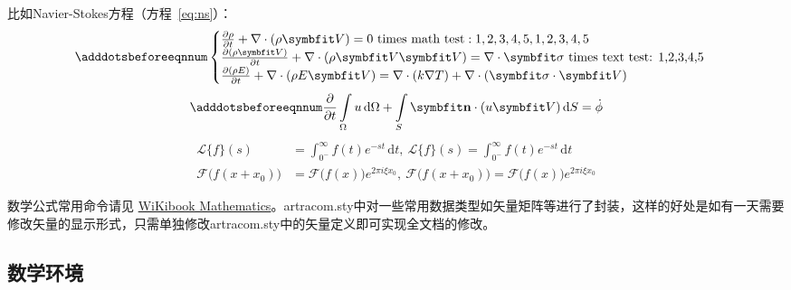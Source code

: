 比如Navier-Stokes方程（方程~\eqref{eq:ns}）：
\begin{equation} \label{eq:ns}
    \adddotsbeforeeqnnum%
    \begin{cases}
        \frac{\partial \rho}{\partial t} + \nabla\cdot(\rho\Vector{V}) = 0 \ \mathrm{times\ math\ test: 1,2,3,4,5}, 1,2,3,4,5\\
        \frac{\partial (\rho\Vector{V})}{\partial t} + \nabla\cdot(\rho\Vector{V}\Vector{V}) = \nabla\cdot\Tensor{\sigma} \ \text{times text test: 1,2,3,4,5}\\
        \frac{\partial (\rho E)}{\partial t} + \nabla\cdot(\rho E\Vector{V}) = \nabla\cdot(k\nabla T) + \nabla\cdot(\Tensor{\sigma}\cdot\Vector{V})
    \end{cases}
\end{equation}
\begin{equation}
    \adddotsbeforeeqnnum%
    \frac{\partial }{\partial t}\int\limits_{\Omega} u \, \mathrm{d}\Omega + \int\limits_{S} \unitVector{n}\cdot(u\Vector{V}) \, \mathrm{d}S = \dot{\phi}
\end{equation}
\[
    \begin{split}
        \mathcal{L} \{f\}(s) &= \int _{0^{-}}^{\infty} f(t) e^{-st} \, \mathrm{d}t, \ 
        \mathscr{L} \{f\}(s) = \int _{0^{-}}^{\infty} f(t) e^{-st} \, \mathrm{d}t\\
        \mathcal{F} {\bigl (} f(x+x_{0}) {\bigr )} &= \mathcal{F} {\bigl (} f(x) {\bigr )} e^{2\pi i\xi x_{0}}, \ 
        \mathscr{F} {\bigl (} f(x+x_{0}) {\bigr )} = \mathscr{F} {\bigl (} f(x) {\bigr )} e^{2\pi i\xi x_{0}}
    \end{split}
\]

数学公式常用命令请见 \href{https://en.wikibooks.org/wiki/LaTeX/Mathematics}{WiKibook Mathematics}。artracom.sty中对一些常用数据类型如矢量矩阵等进行了封装，这样的好处是如有一天需要修改矢量的显示形式，只需单独修改artracom.sty中的矢量定义即可实现全文档的修改。

\subsection{数学环境}

